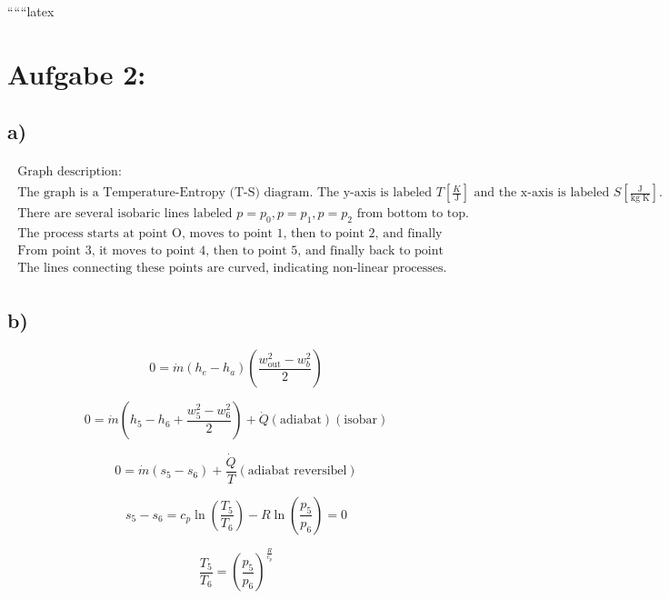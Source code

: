 
``````latex


\section*{Aufgabe 2:}

\subsection*{a)}

\[
\begin{array}{c}
\begin{array}{c}
\text{Graph description:} \\
\text{The graph is a Temperature-Entropy (T-S) diagram. The y-axis is labeled } T \left[ \frac{K}{\text{J}} \right] \text{ and the x-axis is labeled } S \left[ \frac{\text{J}}{\text{kg K}} \right]. \\
\text{There are several isobaric lines labeled } p = p_0, p = p_1, p = p_2 \text{ from bottom to top.} \\
\text{The process starts at point O, moves to point 1, then to point 2, and finally to point 3.} \\
\text{From point 3, it moves to point 4, then to point 5, and finally back to point O.} \\
\text{The lines connecting these points are curved, indicating non-linear processes.}
\end{array}
\end{array}
\]

\subsection*{b)}


\[
0 = \dot{m} (h_e - h_a) \left( \frac{w_{\text{out}}^2 - w_b^2}{2} \right)
\]


\[
0 = \dot{m} (h_5 - h_6 + \frac{w_5^2 - w_6^2}{2}) + \dot{Q} \left( \text{adiabat} \right) \left( \text{isobar} \right)
\]

\[
0 = \dot{m} (s_5 - s_6) + \frac{\dot{Q}}{T} \left( \text{adiabat reversibel} \right)
\]

\[
s_5 - s_6 = c_p \ln \left( \frac{T_5}{T_6} \right) - R \ln \left( \frac{p_5}{p_6} \right) = 0
\]

\[
\frac{T_5}{T_6} = \left( \frac{p_5}{p_6} \right)^{\frac{R}{c_p}}
\]


